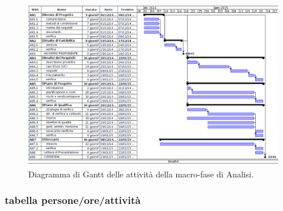 \begin{figure}[h]
\begin{center}
\includegraphics[width=\textwidth, height=\textheight, keepaspectratio]{img/analisi-gantt.png}
\caption{Diagramma di Gantt delle attività della macro-fase di Analisi.}
\end{center}
\end{figure}
\clearpage

\newpage
\subsubsection{tabella persone/ore/attività}

